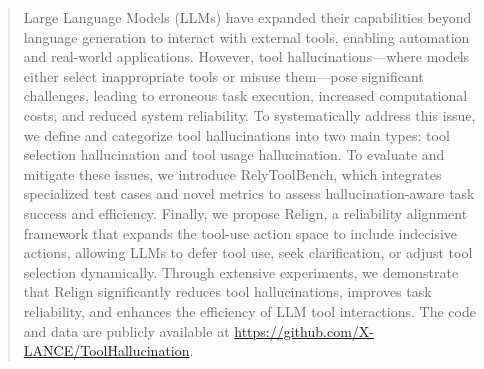 \documentclass{article}
\theoremstyle{plain}
\theoremstyle{definition}
\theoremstyle{remark}
\begin{document}
\begin{abstract}
Large Language Models (LLMs) have expanded their capabilities beyond language generation to interact with external tools, enabling automation and real-world applications. However, tool hallucinations—where models either select inappropriate tools or misuse them—pose significant challenges, leading to erroneous task execution, increased computational costs, and reduced system reliability. To systematically address this issue, we define and categorize tool hallucinations into two main types: tool selection hallucination and tool usage hallucination. To evaluate and mitigate these issues, we introduce RelyToolBench, which integrates specialized test cases and novel metrics to assess hallucination-aware task success and efficiency. Finally, we propose Relign, a reliability alignment framework that expands the tool-use action space to include indecisive actions, allowing LLMs to defer tool use, seek clarification, or adjust tool selection dynamically. Through extensive experiments, we demonstrate that Relign significantly reduces tool hallucinations, improves task reliability, and enhances the efficiency of LLM tool interactions. The code and data are publicly available at \url{https://github.com/X-LANCE/ToolHallucination}.
\end{abstract}










\end{document}
